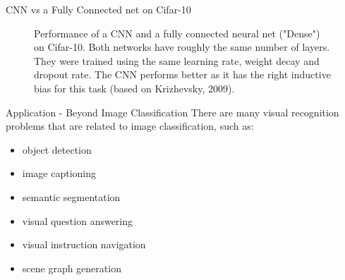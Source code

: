 \begin{frame} {CNN vs a Fully Connected net on Cifar-10}
  \begin{figure}
        \centering
        \caption{Performance of a CNN and a fully connected neural net ("Dense") on Cifar-10. Both networks have roughly the same number of layers. They were trained using the same learning rate, weight decay and dropout rate. The CNN performs better as it has the right inductive bias for this task (based on Krizhevsky, 2009).}
    \end{figure} 
\end{frame}
\begin{vbframe}{Application - Beyond Image Classification}
There are many visual recognition problems that are related to image classification, such as:

\begin{itemize}
    \item object detection
    \item image captioning
    \item semantic segmentation
    \item visual question answering
    \item visual instruction navigation
    \item scene graph generation
\end{itemize}
\end{vbframe}



